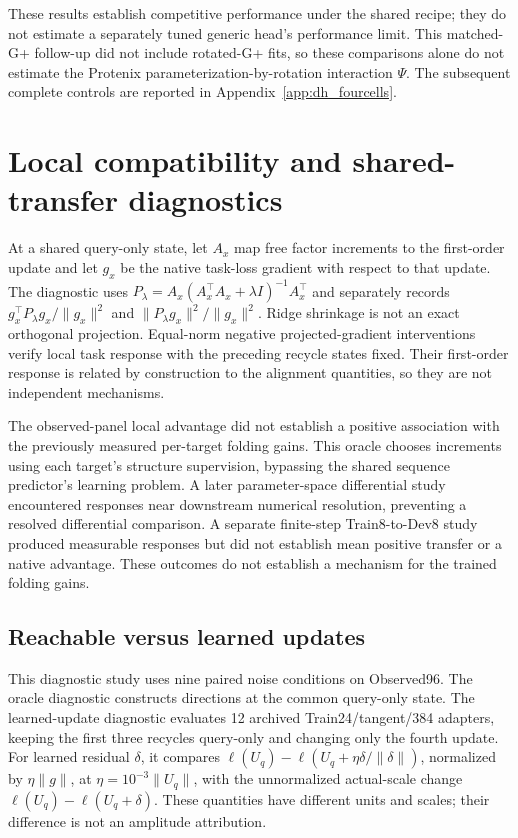 These results establish competitive performance under the shared recipe;
they do not estimate a separately tuned generic head's performance limit.
This matched-G+ follow-up did not include rotated-G+ fits, so these comparisons
alone do not estimate the Protenix parameterization-by-rotation interaction $\Psi$.
The subsequent complete controls are reported in Appendix~\ref{app:dh_fourcells}.



\section{Local compatibility and shared-transfer diagnostics}
\label{app:mechanisms}
At a shared query-only state, let $A_x$ map free factor increments to the
first-order update and let $g_x$ be the native task-loss gradient with respect
to that update. The diagnostic uses
$P_\lambda=A_x(A_x^\top A_x+\lambda I)^{-1}A_x^\top$ and separately records
$g_x^\top P_\lambda g_x/\|g_x\|^2$ and
$\|P_\lambda g_x\|^2/\|g_x\|^2$. Ridge shrinkage is not an exact orthogonal
projection. Equal-norm negative projected-gradient interventions verify local
task response with the preceding recycle states fixed. Their first-order
response is related by construction to the alignment quantities, so they are
not independent mechanisms.

The observed-panel local advantage did not establish a positive association
with the previously measured per-target folding gains. This oracle chooses
increments using each target's structure supervision, bypassing the shared
sequence predictor's learning problem. A later parameter-space differential
study encountered responses near downstream numerical resolution, preventing
a resolved differential comparison. A separate finite-step Train8-to-Dev8 study
produced measurable responses but did not establish mean positive transfer or
a native advantage. These outcomes do not establish a mechanism for the
trained folding gains.

\subsection{Reachable versus learned updates}
This diagnostic study uses nine paired noise conditions on Observed96. The oracle diagnostic
constructs directions at the common query-only state. The learned-update diagnostic evaluates 12 archived
Train24/tangent/384 adapters, keeping the first three recycles query-only and
changing only the fourth update. For learned residual $\delta$, it compares
$\ell(U_q)-\ell(U_q+\eta\delta/\|\delta\|)$, normalized by
$\eta\|g\|$, at $\eta=10^{-3}\|U_q\|$, with the unnormalized actual-scale
change $\ell(U_q)-\ell(U_q+\delta)$. These quantities have different units and
scales; their difference is not an amplitude attribution.

